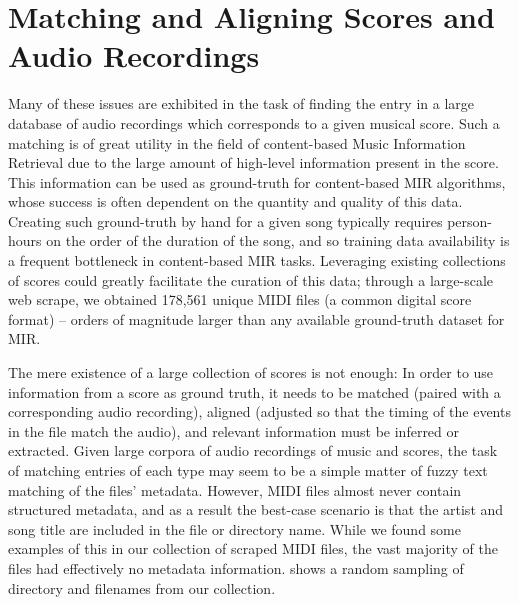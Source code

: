 \section{Matching and Aligning Scores and Audio Recordings}
\label{sec:score_overview}

Many of these issues are exhibited in the task of finding the entry in a large database of audio recordings which corresponds to a given musical score.
Such a matching is of great utility in the field of content-based Music Information Retrieval due to the large amount of high-level information present in the score.
This information can be used as ground-truth for content-based MIR algorithms, whose success is often dependent on the quantity and quality of this data.
Creating such ground-truth by hand for a given song typically requires person-hours on the order of the duration of the song, and so training data availability is a frequent bottleneck in content-based MIR tasks.
Leveraging existing collections of scores could greatly facilitate the curation of this data; through a large-scale web scrape, we obtained 178,561 unique MIDI files (a common digital score format) -- orders of magnitude larger than any available ground-truth dataset for MIR.

The mere existence of a large collection of scores is not enough:  In order to use information from a score as ground truth, it needs to be matched (paired with a corresponding audio recording), aligned (adjusted so that the timing of the events in the file match the audio), and relevant information must be inferred or extracted.
Given large corpora of audio recordings of music and scores, the task of matching entries of each type may seem to be a simple matter of fuzzy text matching of the files' metadata.
However, MIDI files almost never contain structured metadata, and as a result the best-case scenario is that the artist and song title are included in the file or directory name.
While we found some examples of this in our collection of scraped MIDI files, the vast majority of the files had effectively no metadata information.
 shows a random sampling of directory and filenames from our collection.

